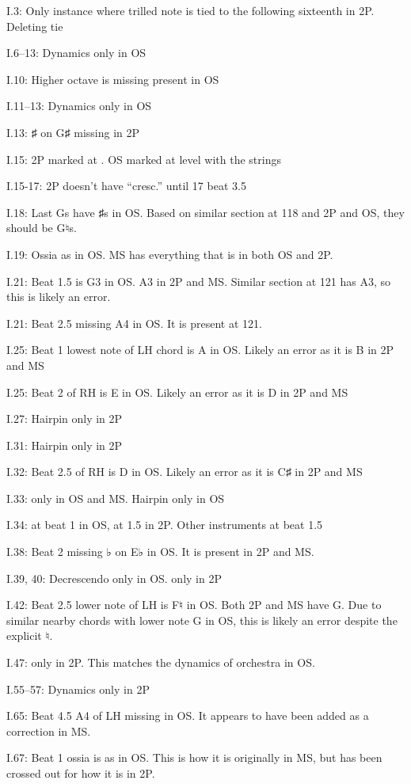 \documentclass[twoside]{article}
\newcommand\dynmark[1]{\scalebox{0.9}{#1}{\kern1pt}}
\begin{document}
\begin{hangparas}{15pt}{1}
\begin{multicols}{2}
I.3: Only instance where trilled note is tied to the following sixteenth in 2P. Deleting tie

I.6--13: Dynamics only in OS

I.10: Higher octave is missing present in OS

I.11--13: Dynamics only in OS

I.13: ♯ on G♯ missing in 2P

I.15: 2P marked at \dynmark{\pp}. OS marked at \dynmark{\p} level with the strings

I.15-17: 2P doesn't have ``cresc.'' until 17 beat 3.5

I.18: Last Gs have ♯s in OS. Based on similar section at 118 and 2P and OS, they should be G♮s.

I.19: Ossia as in OS. MS has everything that is in both OS and 2P.

I.21: Beat 1.5 is G3 in OS. A3 in 2P and MS. Similar section at 121 has A3, so this is likely an error.

I.21: Beat 2.5 missing A4 in OS. It is present at 121.

I.25: Beat 1 lowest note of LH chord is A in OS. Likely an error as it is B in 2P and MS

I.25: Beat 2 of RH is E in OS. Likely an error as it is D in 2P and MS

I.27: Hairpin only in 2P

I.31: Hairpin only in 2P

I.32: Beat 2.5 of RH is D in OS. Likely an error as it is C♯ in 2P and MS

I.33: \dynmark{\pp} only in OS and MS. Hairpin only in OS

I.34: \dynmark{\f} at beat 1 in OS, at 1.5 in 2P. Other instruments \dynmark{\f} at beat 1.5

I.38: Beat 2 missing ♭ on E♭ in OS. It is present in 2P and MS.

I.39, 40: Decrescendo only in OS. \dynmark{\pp} only in 2P

I.42: Beat 2.5 lower note of LH is F♮ in OS. Both 2P and MS have G. Due to similar nearby chords with lower note G in OS, this is likely an error despite the explicit ♮.

I.47: \dynmark{\p} only in 2P. This matches the dynamics of orchestra in OS.

I.55--57: Dynamics only in 2P

I.65: Beat 4.5 A4 of LH missing in OS. It appears to have been added as a correction in MS.

I.67: Beat 1 ossia is as in OS. This is how it is originally in MS, but has been crossed out for how it is in 2P.


\end{multicols}
\end{hangparas}
\end{document}
